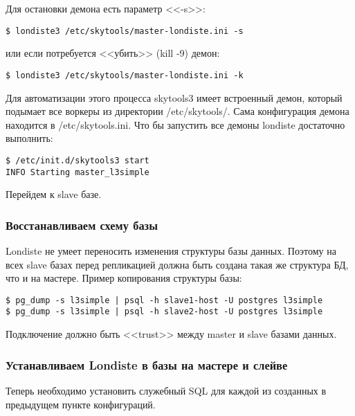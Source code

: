 Для остановки демона есть параметр <<-s>>:
\begin{lstlisting}[label=lst:londiste-replica5,caption=Остановка демона]
$ londiste3 /etc/skytools/master-londiste.ini -s
\end{lstlisting}

или если потребуется <<убить>> (kill -9) демон:
\begin{lstlisting}[label=lst:londiste-replica6,caption=Остановка демона]
$ londiste3 /etc/skytools/master-londiste.ini -k
\end{lstlisting}

Для автоматизации этого процесса skytools3 имеет встроенный демон, который подымает все воркеры из директории /etc/skytools/. Сама конфигурация демона находится в /etc/skytools.ini. Что бы запустить все демоны londiste достаточно выполнить:

\begin{lstlisting}[label=lst:londiste-replica7,caption=Демон для ticker]
$ /etc/init.d/skytools3 start
INFO Starting master_l3simple
\end{lstlisting}

Перейдем к slave базе.


\subsubsection{Восстанавливаем схему базы}
Londiste не умеет переносить изменения структуры базы данных.
Поэтому на всех slave базах перед репликацией должна быть создана такая же структура БД, что и на мастере. Пример копирования структуры базы:

\begin{lstlisting}[label=lst:londiste-schema1,caption=Копирования структуры базы]
$ pg_dump -s l3simple | psql -h slave1-host -U postgres l3simple
$ pg_dump -s l3simple | psql -h slave2-host -U postgres l3simple
\end{lstlisting}

Подключение должно быть <<trust>> между master и slave базами данных.












\subsubsection{Устанавливаем Londiste в базы на мастере и слейве}
Теперь необходимо установить служебный SQL для каждой из созданных в предыдущем
пункте конфигураций.

